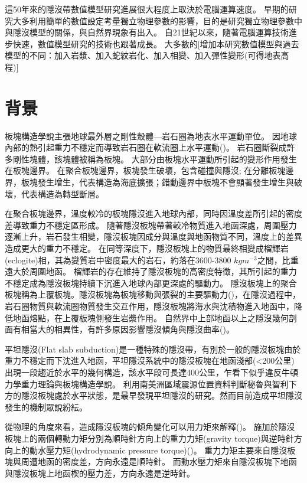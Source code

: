這50年來的隱沒帶數值模型研究進展很大程度上取決於電腦運算速度。
早期的研究大多利用簡單的數值設定考量獨立物理參數的影響，目的是研究獨立物理參數中與隱沒模型的關係，與自然界現象有出入。
自21世紀以來，隨著電腦運算技術進步快速，數值模型研究的技術也跟著成長。
大多數的[增加本研究數值模型與過去模型的不同：加入岩漿、加入蛇紋岩化、加入相變、加入彈性變形(可得地表高程)]

\section{背景}

板塊構造學說主張地球最外層之剛性殼體---岩石圈為地表水平運動單位。
因地球內部的熱引起重力不穩定而導致岩石圈在軟流圈上水平運動(\citealp{jordan1978composition})。
岩石圈斷裂成許多剛性塊體，該塊體被稱為板塊。
大部分由板塊水平運動所引起的變形作用發生在板塊邊界。
在聚合板塊邊界，板塊發生破壞，包含碰撞與隱沒; 在分離板塊邊界，板塊發生增生，代表構造為海底擴張；錯動邊界中板塊不會顯著發生增生與破壞，代表構造為轉型斷層。

在聚合板塊邊界，溫度較冷的板塊隱沒進入地球內部，同時因溫度差所引起的密度差導致重力不穩定區形成。
隨著隱沒板塊帶著較冷物質進入地函深處，周圍壓力逐漸上升，岩石發生相變，隱沒板塊因成分與溫度與地函物質不同，溫度上的差異造成更大的重力不穩定。
在同等深度下，隱沒板塊上的物質最終相變成榴輝岩(eclogite)相，其為變質岩中密度最大的岩石，約落在3600-3800 $kg m^{-3}$之間，比重遠大於周圍地函。
榴輝岩的存在維持了隱沒板塊的高密度特徵，其所引起的重力不穩定成為隱沒板塊持續下沉進入地球內部更深處的驅動力。
隱沒板塊上的聚合板塊稱為上覆板塊。隱沒板塊為板塊移動與張裂的主要驅動力(\citealp{turcotte2002geodynamics})，在隱沒過程中，岩石圈物質與軟流圈物質發生交互作用，隱沒板塊將海水與沈積物進入地函中，降低地函熔點，在上覆板塊側發生岩漿作用。
自然界中上部地函以上之隱沒幾何剖面有相當大的相異性，有許多原因影響隱沒傾角與隱沒曲率(\citealp{schellart2020control})。

平坦隱沒(Flat slab subduction)是一種特殊的隱沒帶，有別於一般的隱沒板塊由於重力不穩定而下沈進入地函，平坦隱沒系統中的隱沒板塊在地函淺部(<200公里)出現一段趨近於水平的幾何構造，該水平段可長達400公里，乍看下似乎違反牛頓力學重力理論與板塊構造學說。
\citealp{barazangi1976}利用南美洲區域震源位置資料判斷秘魯與智利下方的隱沒板塊處於水平狀態，是最早發現平坦隱沒的研究。然而目前造成平坦隱沒發生的機制眾說紛紜。

從物理的角度來看，造成隱沒板塊的傾角變化可以用力矩來解釋(\citealp{stevenson1977angle})。
施加於隱沒板塊上的兩個轉動力矩分別為順時針方向上的重力力矩(gravity torque)與逆時針方向上的動水壓力矩(hydrodynamic pressure torque)(\citealp{McKenzie1969})。
重力力矩主要來自隱沒板塊與周遭地函的密度差，方向永遠是順時針。
而動水壓力矩來自隱沒板塊下地函與隱沒板塊上地函楔的壓力差，方向永遠是逆時針。

